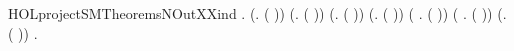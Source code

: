 \begin{SaveVerbatim}{HOLprojectSMTheoremsNOutXXind}
\HOLTokenTurnstile{} \HOLSymConst{\HOLTokenForall{}}.
     (\HOLSymConst{\HOLTokenForall{}}.   ( )) \HOLSymConst{\HOLTokenConj{}} (\HOLSymConst{\HOLTokenForall{}}.   ( )) \HOLSymConst{\HOLTokenConj{}}
     (\HOLSymConst{\HOLTokenForall{}}.   ( )) \HOLSymConst{\HOLTokenConj{}} (\HOLSymConst{\HOLTokenForall{}}.   ( )) \HOLSymConst{\HOLTokenConj{}}
     (\HOLSymConst{\HOLTokenForall{}} .   ( )) \HOLSymConst{\HOLTokenConj{}} (\HOLSymConst{\HOLTokenForall{}} .   ( )) \HOLSymConst{\HOLTokenConj{}}
     (\HOLSymConst{\HOLTokenForall{}}.   ( )) \HOLSymConst{\HOLTokenImp{}}
     \HOLSymConst{\HOLTokenForall{}} .   
\end{SaveVerbatim}
\newcommand{\HOLprojectSMTheoremsNOutXXind}{\UseVerbatim{HOLprojectSMTheoremsNOutXXind}}

